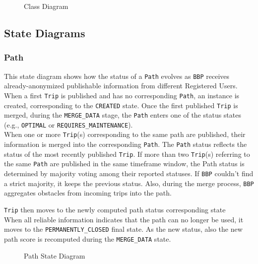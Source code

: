 \begin{figure}[H]
    \centering
    
    \caption{Class Diagram}
    \label{fig:class_diagram}
\end{figure}

\subsection{State Diagrams}
\label{sec:state_diagrams}

\subsubsection{Path}

This state diagram shows how the status of a \texttt{Path} evolves as \texttt{BBP} receives already-anonymized publishable information from different Registered Users. When a first \texttt{Trip} is published and has no corresponding \texttt{Path}, an instance is created, corresponding to the \texttt{CREATED} state. Once the first published \texttt{Trip} is merged, during the \texttt{MERGE\_DATA} stage, the \texttt{Path} enters one of the status states (e.g., \texttt{OPTIMAL} or \texttt{REQUIRES\_MAINTENANCE}).\\
When one or more \texttt{Trip}(s) corresponding to the same path are published, their information is merged into the corresponding \texttt{Path}. The \texttt{Path} status reflects the status of the most recently published \texttt{Trip}. If more than two \texttt{Trip}(s) referring to the same \texttt{Path} are published in the same timeframe window, the Path status is determined by majority voting among their reported statuses. If \texttt{BBP} couldn't find a strict majority, it keeps the previous status. Also, during the merge process, \texttt{BBP} aggregates obstacles from incoming trips into the path.

\texttt{Trip} then moves to the newly computed path status corresponding state \\
When all reliable information indicates that the path can no longer be used, it moves to the \texttt{PERMANENTLY\_CLOSED} final state. As the new status, also the new path score is recomputed during the \texttt{MERGE\_DATA} state.

\begin{figure}[H]
    \centering
    
    \caption{Path State Diagram}
    \label{fig:path_state}
\end{figure}

